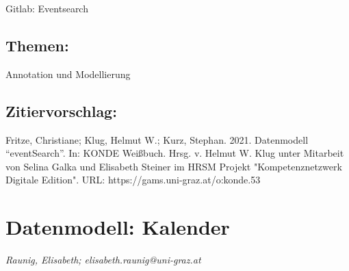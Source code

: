 \documentclass{article}
\begin{document}
{                              Gitlab: Eventsearch}\subsection*{Themen:}Annotation und Modellierung\subsection*{Zitiervorschlag:}Fritze, Christiane; Klug, Helmut W.; Kurz, Stephan. 2021. Datenmodell “eventSearch”. In: KONDE Weißbuch. Hrsg. v. Helmut W. Klug unter Mitarbeit von Selina Galka und Elisabeth Steiner im HRSM Projekt "Kompetenznetzwerk Digitale Edition". URL: https://gams.uni-graz.at/o:konde.53\newpage\section*{Datenmodell: Kalender} \emph{Raunig, Elisabeth; elisabeth.raunig@uni-graz.at}\\
        
\end{document}
